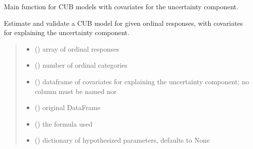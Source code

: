 \documentclass[letterpaper,10pt,english]{sphinxmanual}
\begin{document}

\begin{fulllineitems}
\label{\detokenize{cubmods:cubmods.cub_y0.mle}}
\pysigstartsignatures
{}
\pysigstopsignatures
\sphinxAtStartPar
Main function for CUB models with covariates for the uncertainty component.

\sphinxAtStartPar
Estimate and validate a CUB model for given ordinal responses, with covariates for explaining 
the uncertainty component.
\begin{quote}\begin{description}
\begin{itemize}
\item {} 
\sphinxAtStartPar
{} () \textendash{} array of ordinal responses

\item {} 
\sphinxAtStartPar
{} () \textendash{} number of ordinal categories

\item {} 
\sphinxAtStartPar
{} () \textendash{} dataframe of covariates for explaining the uncertainty component;
no column must be named  nor 

\item {} 
\sphinxAtStartPar
{} () \textendash{} original DataFrame

\item {} 
\sphinxAtStartPar
{} () \textendash{} the formula used

\item {} 
\sphinxAtStartPar
{} (\sphinxstyleliteralemphasis{\sphinxupquote{, }}) \textendash{} dictionary of hypothesized parameters, defaults to None


\end{itemize}
\end{description}
\end{quote}
\end{fulllineitems}
\end{document}
